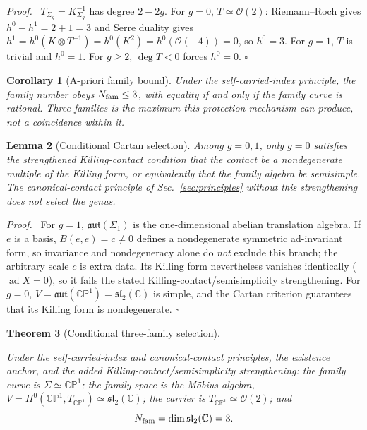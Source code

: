 \documentclass[
  aps,
  prd,
  preprint,
  nofootinbib,
  superscriptaddress,
  longbibliography
]{revtex4-2}
\newcommand{\CP}{\mathbb{CP}}
\newcommand{\cO}{\mathcal{O}}
\newcommand{\aut}{\mathfrak{aut}}
\newcommand{\sltwo}{\mathfrak{sl}_2(\mathbb C)}
\DeclareMathOperator{\ad}{ad}
\newtheorem{theorem}{Theorem}[section]
\newtheorem{lemma}[theorem]{Lemma}
\newtheorem{corollary}[theorem]{Corollary}
\newenvironment{proof}{\par\noindent\textit{Proof.}\ }{\hfill\(\square\)\par}
\begin{document}
\begin{proof}
\(T_{\Sigma_g}=K_{\Sigma_g}^{-1}\) has degree \(2-2g\).  For \(g=0\),
\(T\simeq\cO(2)\): Riemann--Roch gives \(h^0-h^1=2+1=3\) and Serre duality
gives \(h^1=h^0(K\otimes T^{-1})=h^0(K^2)=h^0(\cO(-4))=0\), so \(h^0=3\).
For \(g=1\), \(T\) is trivial and \(h^0=1\).  For \(g\ge2\),
\(\deg T<0\) forces \(h^0=0\).
\end{proof}

\begin{corollary}[A-priori family bound]
\label{cor:bound}
Under the self-carried-index principle, the family number obeys
\(N_{\rm fam}\le3\), with equality if and only if the family curve is
rational.  Three families is the maximum this protection mechanism can
produce, not a coincidence within it.
\end{corollary}

\begin{lemma}[Conditional Cartan selection]
\label{lem:cartan}
Among \(g=0,1\), only \(g=0\) satisfies the \emph{strengthened}
Killing-contact condition that the contact be a nondegenerate multiple of the
Killing form, or equivalently that the family algebra be semisimple.  The
canonical-contact principle of Sec.~\ref{sec:principles} without this
strengthening does not select the genus.
\end{lemma}

\begin{proof}
For \(g=1\), \(\aut(\Sigma_1)\) is the one-dimensional abelian translation
algebra.  If \(e\) is a basis, \(B(e,e)=c\ne0\) defines a nondegenerate
symmetric ad-invariant form, so invariance and nondegeneracy alone do
\emph{not} exclude this branch; the arbitrary scale \(c\) is extra data.
Its Killing form nevertheless vanishes identically (\(\ad X=0\)), so it fails
the stated Killing-contact/semisimplicity strengthening.
For \(g=0\), \(V=\aut(\CP^1)=\sltwo\) is simple, and the Cartan criterion
guarantees that its Killing form is nondegenerate.
\end{proof}

\begin{theorem}[Conditional three-family selection]
\label{thm:threefam}
\mbox{}\par
Under the self-carried-index and canonical-contact principles, the existence
anchor, and the added Killing-contact/semisimplicity strengthening: the family
curve is \(\Sigma\simeq\CP^1\); the family space is the M\"obius algebra,
\(V=H^0(\CP^1,T_{\CP^1})\simeq\sltwo\); the carrier is
\(T_{\CP^1}\simeq\cO(2)\); and
\[
  N_{\rm fam}=\dim\sltwo=3 .
\]
\end{theorem}
\end{document}
